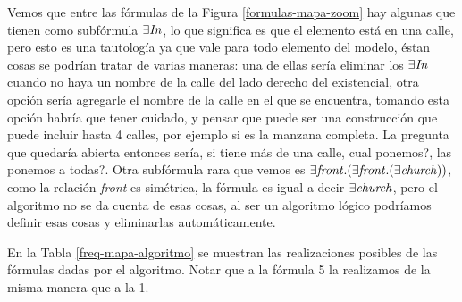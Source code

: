 Vemos que entre las f\'ormulas de la Figura \ref{formulas-mapa-zoom} hay algunas que tienen como subf\'ormula $\exists \mathit{In}$, lo que significa es que 
el elemento est\'a en una calle, pero esto es una tautolog\'ia ya que vale para todo elemento del modelo, \'estan cosas se podr\'ian tratar de varias maneras: una de ellas ser\'ia eliminar los $\exists \mathit{In}$ cuando no haya un nombre de la calle del lado derecho del existencial, 
otra opci\'on ser\'ia agregarle el nombre de la calle en el que se encuentra, tomando esta opci\'on habr\'ia que tener cuidado, 
y pensar que puede ser una construcci\'on que puede incluir hasta 4 calles, por ejemplo si es la manzana completa. La pregunta que quedar\'ia abierta
entonces ser\'ia, si tiene m\'as de una calle, cual ponemos?, las ponemos a todas?.
Otra subf\'ormula rara que vemos es $\exists \mathit{front} .(\exists \mathit{front} .(\exists \mathit{church}))$, como la relaci\'on {\it front} es sim\'etrica, la f\'ormula es igual a decir $\exists \mathit{church}$, pero el algoritmo no se da cuenta de esas cosas, al ser un algoritmo l\'ogico podr\'iamos definir esas cosas y eliminarlas autom\'aticamente.

En la Tabla \ref{freq-mapa-algoritmo} se muestran las realizaciones posibles de las f\'ormulas dadas por el algoritmo. Notar que a la f\'ormula 5 la realizamos de la misma manera que a la 1.

